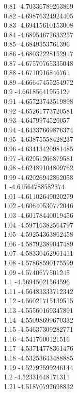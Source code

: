 {0.81	-4.70336789263869\\
0.82	-4.69876324924405\\
0.83	-4.69415610153008\\
0.84	-4.68954672633257\\
0.85	-4.6849353761396\\
0.86	-4.68032228152917\\
0.87	-4.67570765335048\\
0.88	-4.6710916846761\\
0.89	-4.66647455254972\\
0.9	-4.66185641955127\\
0.91	-4.65723743519898\\
0.92	-4.65261773720581\\
0.93	-4.6479974526057\\
0.94	-4.64337669876374\\
0.95	-4.63875558428237\\
0.96	-4.63413420981485\\
0.97	-4.62951266879581\\
0.98	-4.62489104809762\\
0.99	-4.62026942862058\\
1	-4.61564788582374\\
1.01	-4.61102649020279\\
1.02	-4.60640530772046\\
1.03	-4.60178440019456\\
1.04	-4.59716382564797\\
1.05	-4.59254363862458\\
1.06	-4.58792389047489\\
1.07	-4.58330462961411\\
1.08	-4.57868590175599\\
1.09	-4.5740677501245\\
1.1	-4.56945021564596\\
1.11	-4.56483333712342\\
1.12	-4.56021715139515\\
1.13	-4.55560169347891\\
1.14	-4.55098699670332\\
1.15	-4.54637309282771\\
1.16	-4.5417600121516\\
1.17	-4.53714778361476\\
1.18	-4.53253643488885\\
1.19	-4.52792599246144\\
1.2	-4.52331648171311\\
1.21	-4.51870792698832\\
}

